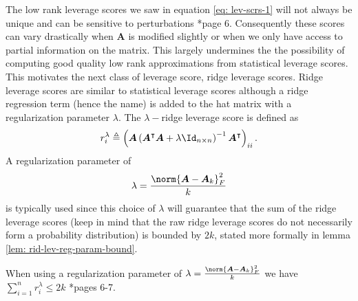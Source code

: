 The low rank leverage scores we saw in equation \ref{eq: lev-scrs-1} will not always be unique and can be sensitive to perturbations \cite{DBLP:journals/corr/CohenMM15}*{page 6}. Consequently these scores can vary drastically when $\bm{A}$ is modified slightly or when we only have access to partial information on the matrix. This largely undermines the the possibility of computing good quality low rank approximations from statistical leverage scores. This motivates the next class of leverage score, ridge leverage scores. Ridge leverage scores are similar to statistical leverage scores although a ridge regression term (hence the name) is added to the hat matrix with a regularization parameter $\lambda$. The $\lambda-$ridge leverage score is defined as
\begin{equation*}
    r_{i}^{\lambda} \triangleq \left( \bm{A} \left( \bm{A}^{\intercal} \bm{A} + \lambda \Id_{n \times n} \right)^{-1} \bm{A}^{\intercal} \right)_{ii}.
\end{equation*}
A regularization parameter of
\begin{equation*} \label{eq: rid-lev-reg-param}
    \lambda = \frac{\norm{\bm{A} - \bm{A}_k}_F^{2}}{k}
\end{equation*}
is typically used since this choice of $\lambda$ will guarantee that the sum of the ridge leverage scores (keep in mind that the raw ridge leverage scores do not necessarily form a probability distribution) is bounded by $2k$, stated more formally in lemma \ref{lem: rid-lev-reg-param-bound}.
\begin{lem} \label{lem: rid-lev-reg-param-bound}
    When using a regularization parameter of $\lambda = \frac{\norm{\bm{A} - \bm{A}_k}_F^{2}}{k}$ we have $\sum_{i=1}^{n} r_{i}^{\lambda} \leq 2k$ \cite{DBLP:journals/corr/CohenMM15}*{pages 6-7}.
\end{lem}
